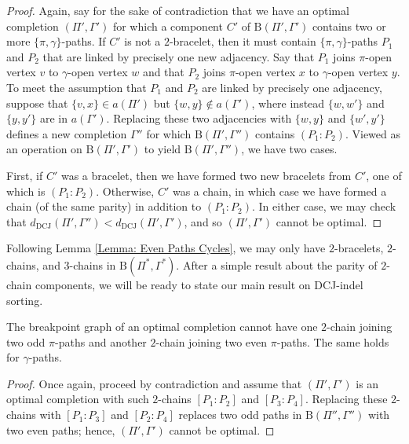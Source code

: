 \begin{proof}
Again, say for the sake of contradiction that we have an optimal completion $(\Pi', \Gamma')$ for which a component $C'$ of $\mathrm{B}(\Pi', \Gamma')$ contains two or more $\{\pi, \gamma\}$-paths.  If $C'$ is not a $2$-bracelet, then it must contain $\{\pi, \gamma\}$-paths $P_1$ and $P_2$ that are linked by precisely one new adjacency.  Say that $P_1$ joins $\pi$-open vertex $v$ to $\gamma$-open vertex $w$ and that $P_2$ joins $\pi$-open vertex $x$ to $\gamma$-open vertex $y$.  To meet the assumption that $P_1$ and $P_2$ are linked by precisely one adjacency, suppose that $\{v, x\} \in a(\Pi')$ but $\{w, y\} \notin a(\Gamma')$, where instead $\{w, w'\}$ and $\{y, y'\}$ are in $a(\Gamma')$.  Replacing these two adjacencies with $\{w, y\}$ and $\{w', y'\}$ defines a new completion $\Gamma''$ for which $\mathrm{B}(\Pi', \Gamma'')$ contains $(P_1:P_2)$. Viewed as an operation on $\mathrm{B}(\Pi', \Gamma')$ to yield $\mathrm{B}(\Pi', \Gamma'')$, we have two cases.

First, if $C'$ was a bracelet, then we have formed two new bracelets from $C'$, one of which is $(P_1:P_2)$.  Otherwise, $C'$ was a chain, in which case we have formed a chain (of the same parity) in addition to $(P_1:P_2)$.  In either case, we may check that $d_{\mathrm{DCJ}}(\Pi', \Gamma'') < d_{\mathrm{DCJ}}(\Pi', \Gamma')$, and so $(\Pi', \Gamma')$ cannot be optimal. 
\end{proof}

Following Lemma \ref{Lemma: Even Paths Cycles}, we may only have $2$-bracelets, $2$-chains, and $3$-chains in $\mathrm{B}(\Pi^*, \Gamma^*)$.  After a simple result about the parity of $2$-chain components, we will be ready to state our main result on DCJ-indel sorting.

\begin{proposition}
The breakpoint graph of an optimal completion cannot have one $2$-chain joining two odd $\pi$-paths and another $2$-chain joining two even $\pi$-paths.  The same holds for $\gamma$-paths.
\label{Proposition: Odd-Even 2-Chains}
\end{proposition}

\begin{proof}
Once again, proceed by contradiction and assume that  $(\Pi', \Gamma')$ is an optimal completion with such $2$-chains $[P_1:P_2]$ and $[P_3:P_4]$. Replacing these $2$-chains with $[P_1:P_3]$ and $[P_2:P_4]$ replaces two odd paths in $\mathrm{B}(\Pi'', \Gamma'')$ with two even paths; hence, $(\Pi', \Gamma')$ cannot be optimal. 
\end{proof}

